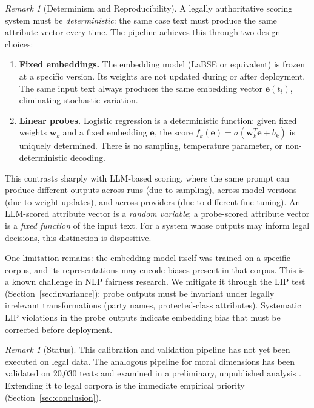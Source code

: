 \documentclass[12pt]{article}
\theoremstyle{definition}
\theoremstyle{remark}
\newtheorem{remark}[theorem]{Remark}
\begin{document}
\begin{remark}[Determinism and Reproducibility]
\label{rem:determinism}
A legally authoritative scoring system must be \emph{deterministic}: the same case text must produce the same attribute vector every time.  The pipeline achieves this through two design choices:

\begin{enumerate}
    \item \textbf{Fixed embeddings.}  The embedding model (LaBSE or equivalent) is frozen at a specific version.  Its weights are not updated during or after deployment.  The same input text always produces the same embedding vector $\mathbf{e}(t_i)$, eliminating stochastic variation.

    \item \textbf{Linear probes.}  Logistic regression is a deterministic function: given fixed weights $\mathbf{w}_k$ and a fixed embedding $\mathbf{e}$, the score $f_k(\mathbf{e}) = \sigma(\mathbf{w}_k^T \mathbf{e} + b_k)$ is uniquely determined.  There is no sampling, temperature parameter, or non-deterministic decoding.
\end{enumerate}

This contrasts sharply with LLM-based scoring, where the same prompt can produce different outputs across runs (due to sampling), across model versions (due to weight updates), and across providers (due to different fine-tuning).  An LLM-scored attribute vector is a \emph{random variable}; a probe-scored attribute vector is a \emph{fixed function} of the input text.  For a system whose outputs may inform legal decisions, this distinction is dispositive.

One limitation remains: the embedding model itself was trained on a specific corpus, and its representations may encode biases present in that corpus.  This is a known challenge in NLP fairness research.  We mitigate it through the LIP test (Section~\ref{sec:invariance}): probe outputs must be invariant under legally irrelevant transformations (party names, protected-class attributes).  Systematic LIP violations in the probe outputs indicate embedding bias that must be corrected before deployment.
\end{remark}

\begin{remark}[Status]
This calibration and validation pipeline has not yet been executed on legal data.  The analogous pipeline for moral dimensions has been validated on 20,030 texts and examined in a preliminary, unpublished analysis \cite{thiele2026}.  Extending it to legal corpora is the immediate empirical priority (Section~\ref{sec:conclusion}).
\end{remark}
\end{document}
